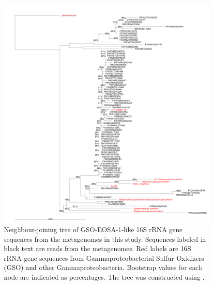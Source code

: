 \begin{figure}[!ht]
  \centering
  \includegraphics[width=\textwidth]{../polarfront/GSO-EOSA-1tree.png}
  \caption[Tree of GSO-EOSA-1 related 16S rRNA genes]{
  Neighbour-joining tree of GSO-EOSA-1-like 16S rRNA gene sequences from the metagenomes in this study.
  Sequences labeled in black text are reads from the metagenomes.
  Red labels are 16S rRNA gene sequences from Gammaproteobacterial Sulfur Oxidizers (GSO) and other Gammaproteobacteria.
  Bootstrap values for each node are indicated as percentages.
  The tree was constructed using  \cite{Ludwig:2004dg}.
  }
  \label{fig:GSO-EOSA-1tree}
\end{figure}
\clearpage
